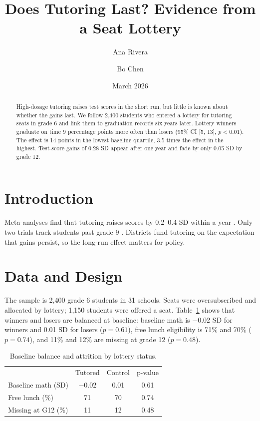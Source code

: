 \documentclass[11pt]{article}
\title{Does Tutoring Last? Evidence from a Seat Lottery}
\author{Ana Rivera \and Bo Chen}
\date{March 2026}
\begin{document}
\maketitle

\begin{abstract}
High-dosage tutoring raises test scores in the short run, but little is known about whether the gains last.
We follow 2,400 students who entered a lottery for tutoring seats in grade 6 and link them to graduation
records six years later. Lottery winners graduate on time 9 percentage points more often than losers
(95\% CI [5, 13], $p < 0.01$). The effect is 14 points in the lowest baseline quartile, 3.5 times the
effect in the highest. Test-score gains of 0.28 SD appear after one year and fade by only 0.05 SD by grade 12.
\end{abstract}

\section{Introduction}
Meta-analyses find that tutoring raises scores by 0.2--0.4 SD within a year \citep{park2021}.
Only two trials track students past grade 9 \citep{okafor2019}. Districts fund tutoring on the
expectation that gains persist, so the long-run effect matters for policy.

\section{Data and Design}
The sample is 2,400 grade 6 students in 31 schools. Seats were oversubscribed and allocated by lottery;
1,150 students were offered a seat. Table~\ref{tab:balance} shows that winners and losers are balanced
at baseline: baseline math is $-0.02$ SD for winners and 0.01 SD for losers ($p = 0.61$), free lunch
eligibility is 71\% and 70\% ($p = 0.74$), and 11\% and 12\% are missing at grade 12 ($p = 0.48$).

\begin{table}[h]
\centering
\caption{Baseline balance and attrition by lottery status.}
\label{tab:balance}
\begin{tabular}{lccc}
 & Tutored & Control & p-value \\
Baseline math (SD) & $-0.02$ & 0.01 & 0.61 \\
Free lunch (\%) & 71 & 70 & 0.74 \\
Missing at G12 (\%) & 11 & 12 & 0.48 \\
\end{tabular}
\end{table}
\end{document}
